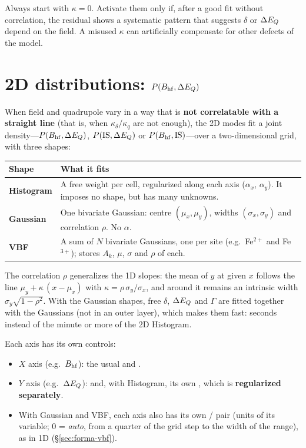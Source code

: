 \begin{truco}
Always start with $\kappa=0$. Activate them only if, after a good fit without
correlation, the residual shows a systematic pattern that suggests $\delta$ or $\Delta E_{Q}$
depend on the field. A misused $\kappa$ can artificially compensate for other defects
of the model.
\end{truco}

\section{2D distributions: $P(B_{\mathrm{hf}}, \Delta E_{Q})$}
\label{sec:dist-2d}

When field and quadrupole vary in a way that is \textbf{not correlatable with a
straight line} (that is, when $\kappa_\delta/\kappa_q$ are not enough), the 2D
modes fit a joint density---$P(B_{\mathrm{hf}}, \Delta E_{Q})$, $P(\text{IS}, \Delta E_{Q})$ or
$P(B_{\mathrm{hf}}, \text{IS})$---over a two-dimensional grid, with three shapes:

\begin{center}
\begin{tabular}{@{}p{}p{}@{}}
\toprule
\textbf{Shape} & \textbf{What it fits} \\
\midrule
\textbf{Histogram} & A free weight per cell, regularized along each axis
($\alpha_x$, $\alpha_y$). It imposes no shape, but has many unknowns. \\[3pt]
\textbf{Gaussian} & One bivariate Gaussian: centre $(\mu_x,\mu_y)$, widths
$(\sigma_x,\sigma_y)$ and correlation $\rho$. No $\alpha$. \\[3pt]
\textbf{VBF} & A sum of $N$ bivariate Gaussians, one per site (e.g.\ Fe$^{2+}$ and
Fe$^{3+}$); stores $A_k$, $\mu$, $\sigma$ and $\rho$ of each. \\
\bottomrule
\end{tabular}
\end{center}

The correlation $\rho$ generalizes the 1D slopes: the mean of $y$ at given $x$
follows the line $\mu_y + \kappa\,(x-\mu_x)$ with $\kappa = \rho\,\sigma_y/\sigma_x$,
and around it remains an intrinsic width $\sigma_y\sqrt{1-\rho^2}$. With the
Gaussian shapes, free $\delta$, $\Delta E_{Q}$ and $\Gamma$ are fitted together with the
Gaussians (not in an outer layer), which makes them fast: seconds instead of the
minute or more of the 2D Histogram.

Each axis has its own controls:

\begin{itemize}[nosep]
  \item $X$ axis (e.g.\ $B_{\mathrm{hf}}$): the usual  and
        .
  \item $Y$ axis (e.g.\ $\Delta E_{Q}$):  and, with
        Histogram, its own , which is \textbf{regularized
        separately}.
  \item With Gaussian and VBF, each axis also has its own  /
         pair (units of its variable; $0$ = \emph{auto}, from a
        quarter of the grid step to the width of the range), as in 1D
        (\S\ref{sec:forma-vbf}).
\end{itemize}

